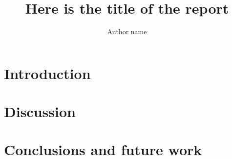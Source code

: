 \documentclass[3p,times,procedia]{elsarticle}
\begin{document}
\begin{frontmatter}



    \title{\textbf{Here is the title of the report}}

    \author{Author name}

    \address{Department of Computer Science, Babe\c s-Bolyai University\\1, M. Kogalniceanu Street, 400084, Cluj-Napoca, Romania\\E-mail: .....}

    \begin{abstract}

    \end{abstract}

    \begin{keyword}
    \end{keyword}
\end{frontmatter}
\section{Introduction}\label{introduction}


\cite{2018_Dafonte} \cite{2018_Tolstikhin}

\section{Discussion}\label{discussion}

\section{Conclusions and future work}\label{conclusions}



\footnotesize{

    
    

}
\end{document}
